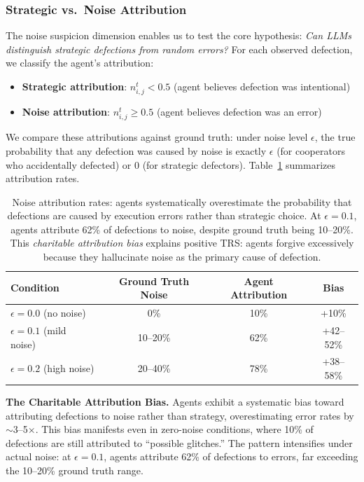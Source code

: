 \documentclass{uai2026} %
\begin{document}
\subsubsection{Strategic vs.~Noise Attribution}

The noise suspicion dimension enables us to test the core hypothesis: \textit{Can LLMs distinguish strategic defections from random errors?} For each observed defection, we classify the agent's attribution:
\begin{itemize}
    \item \textbf{Strategic attribution}: $n_{i,j}^t < 0.5$ (agent believes defection was intentional)
    \item \textbf{Noise attribution}: $n_{i,j}^t \geq 0.5$ (agent believes defection was an error)
\end{itemize}

We compare these attributions against ground truth: under noise level $\epsilon$, the true probability that any defection was caused by noise is exactly $\epsilon$ (for cooperators who accidentally defected) or 0 (for strategic defectors). Table~\ref{tab:attribution} summarizes attribution rates.

\begin{table}[h]
\centering
\begin{tabular}{lccc}
\toprule
\textbf{Condition} & \textbf{Ground Truth Noise} & \textbf{Agent Attribution} & \textbf{Bias} \\
\midrule
$\epsilon=0.0$ (no noise) & 0\% & 10\% & +10\% \\
$\epsilon=0.1$ (mild noise) & 10--20\% & 62\% & +42--52\% \\
$\epsilon=0.2$ (high noise) & 20--40\% & 78\% & +38--58\% \\
\bottomrule
\end{tabular}
\caption{Noise attribution rates: agents systematically overestimate the probability that defections are caused by execution errors rather than strategic choice. At $\epsilon=0.1$, agents attribute 62\% of defections to noise, despite ground truth being 10--20\%. This \textit{charitable attribution bias} explains positive TRS: agents forgive excessively because they hallucinate noise as the primary cause of defection.}
\label{tab:attribution}
\end{table}

\textbf{The Charitable Attribution Bias.} Agents exhibit a systematic bias toward attributing defections to noise rather than strategy, overestimating error rates by $\sim$3--5$\times$. This bias manifests even in zero-noise conditions, where 10\% of defections are still attributed to ``possible glitches.'' The pattern intensifies under actual noise: at $\epsilon=0.1$, agents attribute 62\% of defections to errors, far exceeding the 10--20\% ground truth range.
\end{document}
